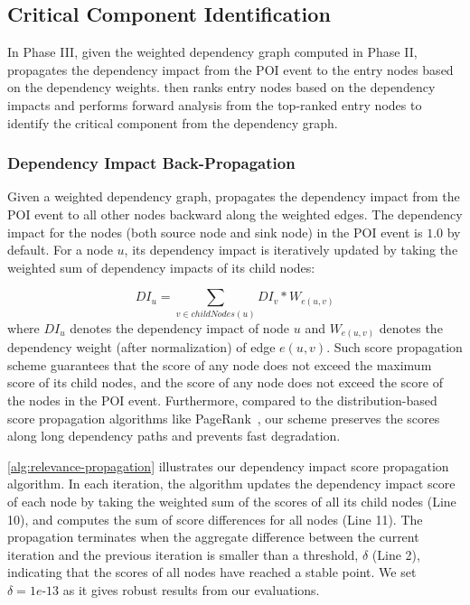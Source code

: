 \subsection{Critical Component Identification}
\label{subsec:phase3}

In Phase III, given the weighted dependency graph computed in Phase II, \tool propagates the dependency impact from the POI event to the entry nodes based on the dependency weights.
\tool then ranks entry nodes based on the dependency impacts and performs  forward analysis from the top-ranked entry nodes to identify the critical component from the dependency graph.





\subsubsection{Dependency Impact Back-Propagation}
\label{subsubsec:propagation}

Given a weighted dependency graph, \tool propagates the dependency impact from the POI event to all other nodes backward along the weighted edges. 
The dependency impact for the nodes (both source node and sink node) in the POI event is $1.0$ by default.
%
For a node $u$, its dependency impact is iteratively updated by taking the weighted sum of dependency impacts of its child nodes: 

\begin{equation}
    \label{eq:reputation}
     DI_{u} =\sum_{v \in childNodes(u)} DI_{v}*W_{e(u,v)}
\end{equation}
where $ DI_{u}$ denotes the dependency impact of node $u$ and $W_{e(u,v)}$ denotes the dependency weight (after normalization) of edge $e(u,v)$.
%
Such score propagation scheme guarantees that the score of any node does not exceed the maximum score of its child nodes, and the score of any node does not exceed the score of the nodes in the POI event.
%
Furthermore, compared to the distribution-based score propagation algorithms like PageRank~\cite{pagerank}, our scheme preserves the scores along long dependency paths and prevents fast degradation.


\cref{alg:relevance-propagation} illustrates our dependency impact score propagation algorithm. 
In each iteration, the algorithm updates the dependency impact score of each node by taking the weighted sum of the scores of  all its child nodes (Line 10), and computes the sum of score differences for all nodes (Line 11).
The propagation terminates when the aggregate difference between the current iteration and the previous iteration is smaller than a threshold, $\delta$ (Line 2), indicating that the scores of all nodes have reached a stable point.
We set $\delta = 1e\mbox{-}13$ as it gives robust results from our evaluations.



